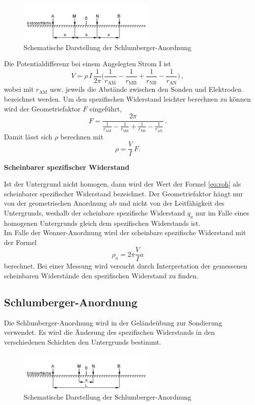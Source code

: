 \begin{figure}[h]
\centering
\includegraphics[width=0.6\textwidth]{Wenner.png}
\caption{Schematische Darstellung der Schlumberger-Anordnung}
\label{abb:Wenner}
\end{figure}
Die Potentialdifferenz bei einem Angelegten Strom I ist
\begin{equation}
V = \rho \, I \, \frac{1}{2 \pi} \big(\frac{1}{r_{\mathrm{AM}}} - \frac{1}{r_{\mathrm{MB}}} + \frac{1}{r_{\mathrm{NB}}} - \frac{1}{r_{\mathrm{AN}}} \big) \, ,
\end{equation}
wobei mit $r_{\mathrm{AM}}$ usw. jeweils die Abstände zwischen den Sonden und Elektroden bezeichnet werden.
Um den spezifischen Widerstand leichter berechnen zu können wird der Geometriefaktor $F$ eingeführt,
$$F = \frac{2 \pi}{\frac{1}{r_{\mathrm{AM}}} - \frac{1}{r_{\mathrm{MB}}} + \frac{1}{r_{\mathrm{NB}}} - \frac{1}{r_{\mathrm{AN}}}}\,.$$
Damit lässt sich $\rho$ berechnen mit 
\begin{equation}
\rho = \frac{V}{I} \, F.
\end{equation} \label{eq:roh}

\textbf{Scheinbarer spezifischer Widerstand}

Ist der Untergrund nicht homogen, dann wird der Wert der Formel \ref{eq:roh} als scheinbarer spezifischer Widerstand bezeichnet. Der Geometriefaktor hängt nur von der geometrischen Anordnung ab und nicht von der 
Leitfähigkeit des Untergrunds, weshalb der scheinbare spezifische Widerstand $q_a$ nur im Falle eines homogenen Untergrunds gleich dem spezifischen Widerstands ist.\\
Im Falle der Wenner-Anordnung wird  der scheinbare spezifische Widerstand mit der Formel
$$ \rho_a = 2 \pi \frac{V}{I} a $$
berechnet.
Bei einer Messung wird versucht durch Interpretation der gemessenen scheinbaren Widerstände den spezifischen Widerstand zu finden.

\subsection{Schlumberger-Anordnung}
Die Schlumberger-Anordnung wird in der Geländeübung zur Sondierung verwendet. Es wird die Änderung des spezifischen Widerstands in den verschiedenen Schichten den Untergrunds bestimmt.

\begin{figure}[h]
\centering
\includegraphics[width=0.6\textwidth]{Schlumberger.png}
\caption{Schematische Darstellung der Schlumberger-Anordnung}
\label{abb:Schlumberger}
\end{figure}










